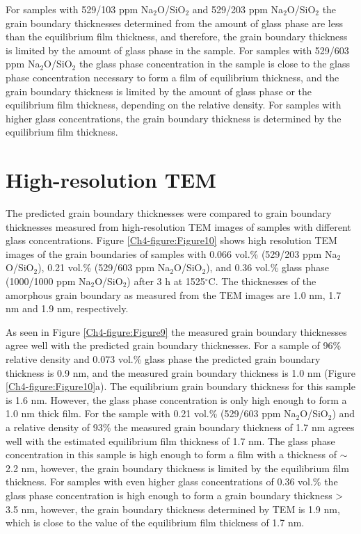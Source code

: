 For samples with 529/103 ppm Na$_{2}$O/SiO$_{2}$ and 529/203 ppm Na$_{2}$O/SiO$_{2}$ the grain boundary thicknesses determined from the amount of glass phase are less than the equilibrium film thickness, and therefore, the grain boundary thickness is limited by the amount of glass phase in the sample. For samples with 529/603 ppm Na$_{2}$O/SiO$_{2}$ the glass phase concentration in the sample is close to the glass phase concentration necessary to form a film of equilibrium thickness, and the grain boundary thickness is limited by the amount of glass phase or the equilibrium film thickness, depending on the relative density. For samples with higher glass concentrations, the grain boundary thickness is determined by the equilibrium film thickness. 

\section{High-resolution TEM}
The predicted grain boundary thicknesses were compared to grain boundary thicknesses measured from high-resolution TEM images of samples with different glass concentrations. Figure \ref{Ch4-figure:Figure10} shows high resolution TEM images of the grain boundaries of samples with 0.066 vol.\% (529/203 ppm Na$_{2}$O/SiO$_{2}$), 0.21 vol.\% (529/603 ppm Na$_{2}$O/SiO$_{2}$), and 0.36 vol.\% glass phase (1000/1000 ppm Na$_{2}$O/SiO$_{2}$) after 3 h at 1525$^{\circ}$C. The thicknesses of the amorphous grain boundary as measured from the TEM images are 1.0 nm, 1.7 nm and 1.9 nm, respectively. 

As seen in Figure \ref{Ch4-figure:Figure9} the measured grain boundary thicknesses agree well with the predicted grain boundary thicknesses. For a sample of 96\% relative density and 0.073 vol.\% glass phase the predicted grain boundary thickness is 0.9 nm, and the measured grain boundary thickness is 1.0 nm (Figure \ref{Ch4-figure:Figure10}a). The equilibrium grain boundary thickness for this sample is 1.6 nm. However, the glass phase concentration is only high enough to form a 1.0 nm thick film. For the sample with 0.21 vol.\% (529/603 ppm Na$_{2}$O/SiO$_{2}$) and a relative density of 93\% the measured grain boundary thickness of 1.7 nm agrees well with the estimated equilibrium film thickness of 1.7 nm. The glass phase concentration in this sample is high enough to form a film with a thickness of $\sim$2.2 nm, however, the grain boundary thickness is limited by the equilibrium film thickness. For samples with even higher glass concentrations of 0.36 vol.\% the glass phase concentration is high enough to form a grain boundary thickness > 3.5 nm, however, the grain boundary thickness determined by TEM is 1.9 nm, which is close to the value of the equilibrium film thickness of 1.7 nm.

